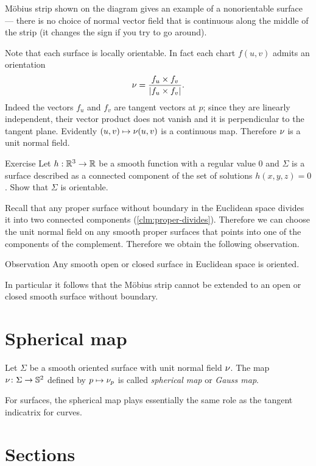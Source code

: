 M\"obius strip shown on the diagram gives an example of a nonorientable surface --- there is no choice of normal vector field that is continuous along the middle of the strip (it changes the sign if you try to go around).


Note that each surface is locally orientable.
In fact each chart $f(u,v)$ admits an orientation 
\[\nu=
\frac{f_u\times f_v}
{\left|f_u\times f_v\right|}.\]
Indeed the vectors $f_u$ and $f_v$ are tangent vectors at $p$; 
since they are linearly independent, their vector product does not vanish and it is perpendicular to the tangent plane.
Evidently $(u,v)\mapsto \nu(u,v)$ is a continuous map.
Therefore $\nu$ is a unit normal field. 

\begin{thm}{Exercise}\label{ex:implicit-orientable}
Let $h:\mathbb{R}^3\to\mathbb{R}$ be a smooth function with a regular value $0$ and $\Sigma$ is a surface described as a connected component of the set of solutions $h(x,y,z)=0$.
Show that $\Sigma$ is orientable.
\end{thm}

Recall that any proper surface without boundary in the Euclidean space divides it into two connected components (\ref{clm:proper-divides}).
Therefore we can choose the unit normal field on any smooth proper surfaces that points into one of the components of the complement.
Therefore we obtain the following observation. 

\begin{thm}{Observation}
Any smooth open or closed surface in Euclidean space is oriented.
\end{thm}

In particular it follows that the M\"obius strip cannot be extended to an open or closed smooth surface without boundary.


\section{Spherical map}

Let $\Sigma$ be a smooth oriented surface with unit normal field $\nu$.
The map $\nu\colon\Sigma\to \mathbb{S}^2$ defined by $p\mapsto \nu_p$ is called \emph{spherical map} or \emph{Gauss map}.

For surfaces, the spherical map plays essentially the same role as the tangent indicatrix for curves.

\section{Sections}%

